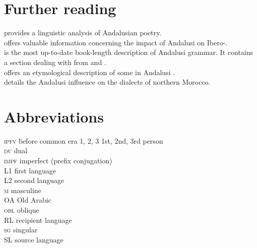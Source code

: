 \documentclass[output=paper,modfonts,nonflat]{langsci/langscibook}
\begin{document}
\section*{Further reading}

\citet{Corriente1997poetry} provides a linguistic analysis of Andalusian  poetry.\\
\citet{Corriente2005} offers valuable information concerning the impact of Andalusi  on Ibero-.\\
\citet{CorrientePereiraVicente2015} is the most up-to-date book-length description of Andalusi  grammar. It contains a section dealing with  from  and .\\ 
\citet{Ferrando1997} offers an etymological description of some   in Andalusi .\\ 
\citet{Vicente2010} details the Andalusi influence on the dialects of northern Morocco. 


\section*{Abbreviations}
\begin{multicols}{2}
\begin{tabbing}
\textsc{ipfv} \hspace{1em} \= before common era\kill
\textsc{1, 2, 3} \> 1st, 2nd, 3rd person \\
\textsc{du} \> dual \\
\textsc{impf} \> imperfect (prefix conjugation) \\
L1 \> first language \\
L2 \> second language \\
\textsc{m} \> masculine \\
OA \> {Old} {Arabic} \\
\textsc{obl} \> oblique \\
{RL} \> {recipient language} \\
\textsc{sg} \> singular \\
{SL} \> {source language}
\end{tabbing}
\end{multicols}



\sloppy\printbibliography[heading=subbibliography,notkeyword=this]
\end{document}

